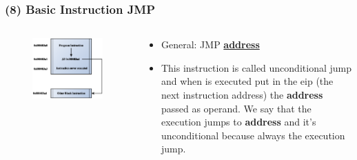 \documentclass[]{beamer}
\begin{document}
		\begin{frame}
			\frametitle{(8) Basic Instruction JMP}
				\begin{columns}
					\begin{column}[left]{2.5in}
						\begin{figure}
							\includegraphics[width=\textwidth]{images/jmp.eps}
							
							\label{Control Flow JMP}
						\end{figure}
					\end{column}
					\begin{column}[right]{2.5in}
						\begin{itemize}	
							\item{General: JMP \underline{\textbf{address}}}\\

							\item{This instruction is called unconditional jump and when is executed put in the eip (the next instruction address) the \textbf{address} passed as operand. We say that the execution jumps to \textbf{address} and it's unconditional because always the execution jump.}
						\end{itemize}

					\end{column}
				\end{columns}
		\end{frame}
\end{document}
